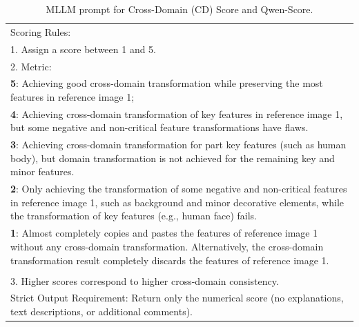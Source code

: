 \documentclass{llmxive}
\begin{document}
\begin{table}[!t]
{\begin{tabular}{p{}}
Scoring Rules: \\
1. Assign a score between 1 and 5. \\
2. Metric: \\
         \hspace{1em}  \textbf{5}: Achieving good cross-domain transformation while preserving the most features in reference image 1; \\
         \hspace{1em} \textbf{4}: Achieving cross-domain transformation of key features in reference image 1, but some negative and non-critical feature transformations have flaws. \\
        \hspace{1em} \textbf{3}: Achieving cross-domain transformation for part key features (such as human body), but domain transformation is not achieved for the remaining key and minor features. \\
         \hspace{1em} \textbf{2}: Only achieving the transformation of some negative and non-critical features in reference image 1, such as background and minor decorative elements, while the transformation of key features (e.g., human face) fails. \\
         \hspace{1em} \textbf{1}: Almost completely copies and pastes the features of reference image 1 without any cross-domain transformation. Alternatively, the cross-domain transformation result completely discards the features of reference image 1. \\ \\
3. Higher scores correspond to higher cross-domain consistency. \\
Strict Output Requirement: Return only the numerical score (no explanations, text descriptions, or additional comments).  \\
 \bottomrule
\end{tabular}%
}
\caption{MLLM prompt for Cross-Domain (CD) Score and Qwen-Score.}
\label{tab:cd score}
\end{table}
\end{document}

